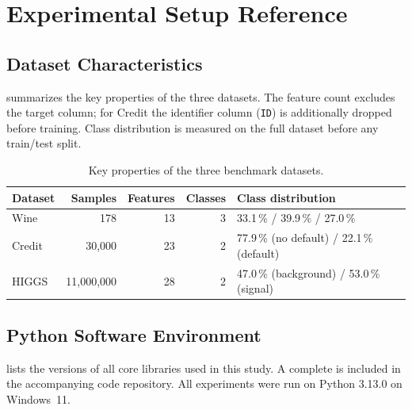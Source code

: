 \chapter{Experimental Setup Reference}
\label{app:setup}

\section{Dataset Characteristics}
\label{app:datasets}

 summarizes the key properties of the three datasets. The feature count excludes the target column; for Credit the identifier column (\texttt{ID}) is additionally dropped before training. Class distribution is measured on the full dataset before any train/test split.

\begin{table}[htbp]
\centering
\caption{Key properties of the three benchmark datasets.}
\label{tab:app_datasets}
\begin{tabular}{@{} l r r r l @{}}
\toprule
\textbf{Dataset} & \textbf{Samples} & \textbf{Features} & \textbf{Classes} & \textbf{Class distribution} \\
\midrule
Wine         &        178 & 13 & 3 & 33.1\,\% / 39.9\,\% / 27.0\,\% \\
Credit       &     30{,}000 & 23 & 2 & 77.9\,\% (no default) / 22.1\,\% (default) \\
HIGGS        & 11{,}000{,}000 & 28 & 2 & 47.0\,\% (background) / 53.0\,\% (signal) \\
\bottomrule
\end{tabular}
\end{table}

\section{Python Software Environment}
\label{app:software}

 lists the versions of all core libraries used in this study. A complete  is included in the accompanying code repository. All experiments were run on Python 3.13.0 on Windows~11.

